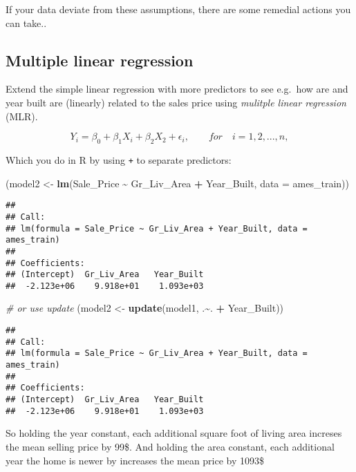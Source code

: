 \documentclass[]{article}
\newenvironment{Shaded}{\begin{snugshade}}{\end{snugshade}}
\newcommand{\CommentTok}[1]{\textcolor[rgb]{0.56,0.35,0.01}{\textit{#1}}}
\newcommand{\DataTypeTok}[1]{\textcolor[rgb]{0.13,0.29,0.53}{#1}}
\newcommand{\KeywordTok}[1]{\textcolor[rgb]{0.13,0.29,0.53}{\textbf{#1}}}
\newcommand{\NormalTok}[1]{#1}
\newcommand{\OperatorTok}[1]{\textcolor[rgb]{0.81,0.36,0.00}{\textbf{#1}}}
\newcommand{\StringTok}[1]{\textcolor[rgb]{0.31,0.60,0.02}{#1}}
\begin{document}
If your data deviate from these assumptions, there are some remedial
actions you can take..

\hypertarget{multiple-linear-regression}{%
\subsection{Multiple linear
regression}\label{multiple-linear-regression}}

Extend the simple linear regression with more predictors to see e.g.~how
are and year built are (linearly) related to the sales price using
\emph{mulitple linear regression} (MLR).

\[Y_i=\beta_0+\beta_1 X_i+\beta_2 X_2 + \epsilon_i, \qquad for \quad i=1,2,...,n,\]

Which you do in R by using \texttt{+} to separate predictors:

\begin{Shaded}
\begin{Highlighting}[]
\NormalTok{(model2 <{-}}\StringTok{ }\KeywordTok{lm}\NormalTok{(Sale\_Price }\OperatorTok{\textasciitilde{}}\StringTok{ }\NormalTok{Gr\_Liv\_Area }\OperatorTok{+}\StringTok{ }\NormalTok{Year\_Built, }\DataTypeTok{data =}\NormalTok{ ames\_train))}
\end{Highlighting}
\end{Shaded}

\begin{verbatim}
## 
## Call:
## lm(formula = Sale_Price ~ Gr_Liv_Area + Year_Built, data = ames_train)
## 
## Coefficients:
## (Intercept)  Gr_Liv_Area   Year_Built  
##  -2.123e+06    9.918e+01    1.093e+03
\end{verbatim}

\begin{Shaded}
\begin{Highlighting}[]
\CommentTok{\# or use update}
\NormalTok{(model2 <{-}}\StringTok{ }\KeywordTok{update}\NormalTok{(model1, .}\OperatorTok{\textasciitilde{}}\NormalTok{. }\OperatorTok{+}\StringTok{ }\NormalTok{Year\_Built))}
\end{Highlighting}
\end{Shaded}

\begin{verbatim}
## 
## Call:
## lm(formula = Sale_Price ~ Gr_Liv_Area + Year_Built, data = ames_train)
## 
## Coefficients:
## (Intercept)  Gr_Liv_Area   Year_Built  
##  -2.123e+06    9.918e+01    1.093e+03
\end{verbatim}

So holding the year constant, each additional square foot of living area
increses the mean selling price by 99\$. And holding the area constant,
each additional year the home is newer by increases the mean price by
1093\$
\end{document}
